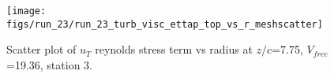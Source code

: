 \begin{figure}[H]
\centering
\texttt{[image: figs/run\_23/run\_23\_turb\_visc\_ettap\_top\_vs\_r\_meshscatter]}
\caption{Scatter plot of $
u_T$ reynolds stress term vs radius at $z/c$=7.75, $V_{free}$=19.36, station 3.}
\label{fig:run_23_turb_visc_ettap_top_vs_r_meshscatter}
\end{figure}


